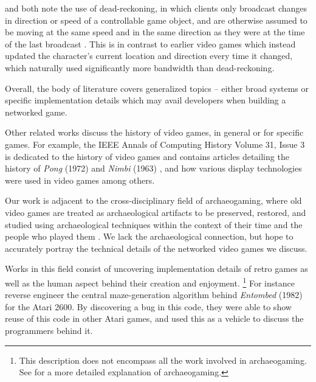 \citet{Das1997NetEffect} and \citet{Blau1992NetworkedEnvironments} both note the use of dead-reckoning, in which clients only broadcast changes in direction or speed of a controllable game object, and are otherwise assumed to be moving at the same speed and in the same direction as they were at the time of the last broadcast \cite{Blau1992NetworkedEnvironments}. This is in contrast to earlier video games which instead updated the character's current location and direction every time it changed, which naturally used significantly more bandwidth than dead-reckoning.

Overall, the body of literature covers generalized topics -- either broad systems or specific implementation details which may avail developers when building a networked game.

Other related works discuss the history of video games, in general or for specific games. For example, the IEEE Annals of Computing History Volume 31, Issue 3 is dedicated to the history of video games and contains articles detailing the history of \textit{Pong} (1972) \cite{lowood} and \textit{Nimbi} (1963) \cite{jorgensen}, and how various display technologies were used in video games \cite{bogost} among others.

Our work is adjacent to the cross-disciplinary field of archaeogaming, where old video games are treated as archaeological artifacts to be preserved, restored, and studied using archaeological techniques within the context of their time and the people who played them \cite{aycock}. We lack the archaeological connection, but hope to accurately portray the technical details of the networked video games we discuss.

Works in this field consist of uncovering implementation details of retro games as well as the human aspect behind their creation and enjoyment.
\footnote{This description does not encompass all the work involved in archaeogaming. See \cite{aycock} for a more detailed explanation of archaeogaming.}
For instance \citet{Aycock2018} reverse engineer the central maze-generation algorithm behind \textit{Entombed} (1982) for the Atari 2600. By discovering a bug in this code, they were able to show reuse of this code in other Atari games, and used this as a vehicle to discuss the programmers behind it.
